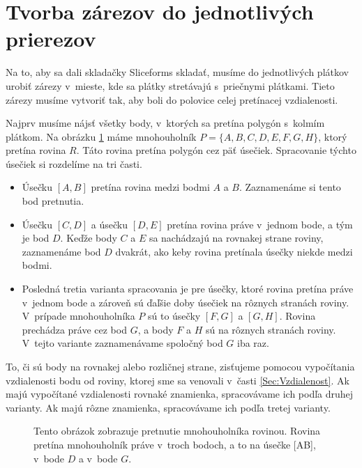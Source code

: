 


\section{Tvorba zárezov do jednotlivých prierezov}
Na to, aby sa dali skladačky Sliceforms skladať, musíme do jednotlivých plátkov urobiť zárezy v~mieste, kde sa plátky stretávajú s~priečnymi plátkami.
Tieto zárezy musíme vytvoriť tak, aby boli do polovice celej pretínacej vzdialenosti.

Najprv musíme nájsť všetky body, v~ktorých sa pretína polygón s~kolmím plátkom. Na obrázku \ref{fig:TvorbaZarezov} máme mnohouholník $P = \{A, B, C, D, E, F, G, H\}$, ktorý pretína rovina $R$. Táto rovina pretína polygón cez päť úsečiek. Spracovanie týchto úsečiek si rozdelíme na tri časti.
\begin{itemize}
\item Úsečku $[A, B]$ pretína rovina medzi bodmi $A$ a $B$. Zaznamenáme si tento bod pretnutia.
\item Úsečku $[C, D]$ a úsečku $[D, E]$ pretína rovina práve v~jednom bode, a tým je bod $D$. Keďže body $C$ a $E$ sa nachádzajú na rovnakej strane roviny, zaznamenáme bod $D$ dvakrát, ako keby rovina pretínala úsečky niekde medzi bodmi.
\item Posledná tretia varianta spracovania je pre úsečky, ktoré rovina pretína práve v~jednom bode a zároveň sú ďaľšie doby úsečiek na rôznych stranách roviny. V~prípade mnohouholníka $P$ sú to úsečky $[F, G]$ a $[G, H]$. Rovina prechádza práve cez bod $G$, a body $F$ a $H$ sú na rôznych stranách roviny. V~tejto variante zaznamenávame spoločný bod $G$ iba raz.
\end{itemize}
To, či sú body na rovnakej alebo rozličnej strane, zisťujeme pomocou vypočítania vzdialenosti bodu od roviny, ktorej sme sa venovali v~časti \ref{Sec:Vzdialenost}. Ak majú vypočítané vzdialenosti rovnaké znamienka, spracovávame ich podľa druhej varianty. Ak majú rôzne znamienka, spracovávame ich podľa tretej varianty.


\begin{figure}[!h]
\centering
{}
\caption{Tento obrázok zobrazuje pretnutie mnohouholníka rovinou. Rovina pretína mnohouholník práve v~troch bodoch, a to na úsečke [AB], v~bode $D$ a v~bode $G$.}
\label{fig:TvorbaZarezov}
\end{figure}

